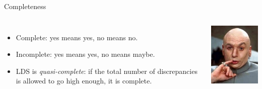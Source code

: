 \documentclass{beamer}
\begin{document}
\begin{frame}{Completeness}
    \begin{columns}
        \begin{itemize}
            \item Complete: yes means yes, no means no.
            \item Incomplete: yes means yes, no means maybe.
            \item LDS is \emph{quasi-complete}: if the total number of discrepancies is allowed to go
                high enough, it is complete.
        \end{itemize}
        \centering\includegraphics*[keepaspectratio=true,scale=0.4]{images/quasi.jpg}
    \end{columns}
\end{frame}
\end{document}
